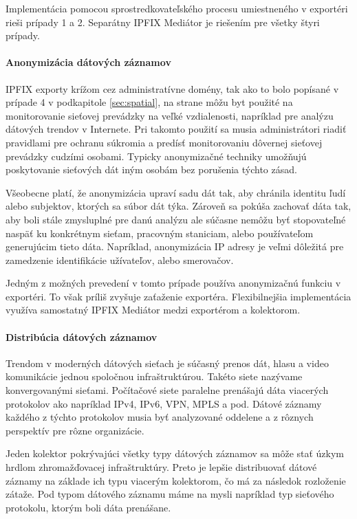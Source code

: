 Implementácia pomocou sprostredkovateľského procesu umiestneného v exportéri rieši prípady 1 a 2. 
Separátny IPFIX Mediátor je riešením pre  všetky štyri prípady.

\paragraph{Anonymizácia dátových záznamov}

IPFIX exporty krížom cez administratívne domény, tak ako to bolo popísané v prípade 4 
v podkapitole \ref{sec:spatial}, na strane \pageref{sec:spatial} môžu 
byt použité na monitorovanie sieťovej prevádzky na veľké vzdialenosti, 
napríklad pre analýzu dátových trendov v Internete. Pri takomto použití sa musia administrátori riadiť
pravidlami pre ochranu súkromia a predísť monitorovaniu dôvernej sieťovej prevádzky cudzími osobami.
Typicky anonymizačné techniky umožňujú poskytovanie sieťových dát iným osobám bez porušenia týchto zásad.

Všeobecne platí, že anonymizácia upraví sadu dát tak, aby chránila identitu ľudí alebo subjektov, 
ktorých sa súbor dát týka. Zároveň sa pokúša zachovať dáta tak, aby boli stále zmysluplné pre danú 
analýzu ale súčasne nemôžu byť stopovateľné naspäť ku konkrétnym sieťam, pracovným staniciam, alebo 
používateľom generujúcim tieto dáta. Napríklad, anonymizácia IP adresy je veľmi dôležitá pre 
zamedzenie identifikácie užívateľov, alebo smerovačov. 

Jedným z možných prevedení v tomto prípade používa anonymizačnú funkciu v exportéri. 
To však príliš zvyšuje zaťaženie exportéra. Flexibilnejšia implementácia využíva samostatný 
IPFIX Mediátor medzi exportérom a kolektorom.

\paragraph{Distribúcia dátových záznamov}

Trendom v moderných dátových sieťach je súčasný prenos dát, hlasu a video komunikácie jednou 
spoločnou infraštruktúrou. Takéto siete nazývame konvergovanými sieťami. 
Počítačové siete paralelne prenášajú dáta viacerých protokolov ako napríklad
IPv4, IPv6, VPN, MPLS a pod. Dátové záznamy každého z týchto protokolov musia byť analyzované 
oddelene a z rôznych perspektív pre rôzne organizácie.

Jeden kolektor pokrývajúci všetky typy dátových záznamov sa môže stať úzkym hrdlom 
zhromažďovacej infraštruktúry. Preto je lepšie distribuovať dátové záznamy na základe ich 
typu viacerým kolektorom, čo má za následok rozloženie zátaže. Pod typom dátového 
záznamu máme na mysli napríklad typ sieťového protokolu, ktorým boli dáta prenášane. 

